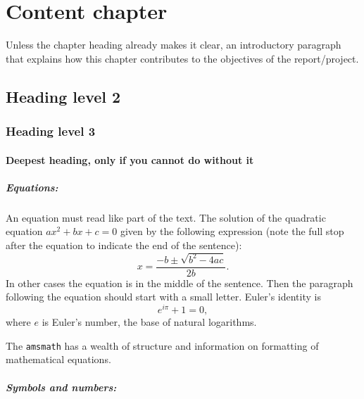 \chapter{Content chapter}

Unless the chapter heading already makes it clear, an introductory paragraph that explains how this chapter contributes to the objectives of the report/project.

\section{Heading level 2}

\subsection{Heading level 3}

\subsubsection{Deepest heading, only if you cannot do without it}
\vspace{2cm}

\paragraph{Equations:}

An equation must read like part of the text. The solution of the quadratic equation $ax^2+bx+c=0$ given by the following expression (note the full stop after the equation to indicate the end of the sentence):
\begin{equation}
    x = \frac{-b \pm \sqrt{b^2-4ac}}{2b} .
\end{equation}
In other cases the equation is in the middle of the sentence. Then the paragraph following the equation should start with a small letter. Euler's identity is 
\begin{equation}
    e^{i \pi} + 1 = 0 ,
\end{equation}
where $e$ is Euler's number, the base of natural logarithms.

The \texttt{amsmath} has a wealth of structure and information on formatting of mathematical equations.

\pagebreak
\paragraph{Symbols and numbers:}

